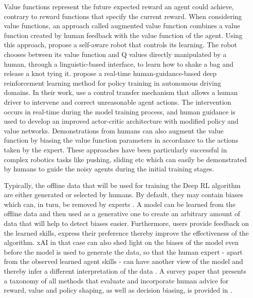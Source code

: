 \documentclass[twoside,11pt]{article}
\begin{document}
Value functions represent the future expected reward an agent could achieve, contrary to reward functions that specify the current reward. When considering value functions, an approach called augmented value function combines a value function created by human feedback with the value function of the agent. Using this approach, \cite{kartoun:10} propose a self-aware robot that controls its learning. The robot chooses between its value function and Q values directly manipulated by a human, through a linguistic-based interface, to learn how to shake a bag and release a knot tying it. \cite{jiang:21} propose a real-time human-guidance-based deep reinforcement learning method for policy training in autonomous driving domains. In their work, \cite{wu:21} use a control transfer mechanism that allows a human driver to intervene and correct unreasonable agent actions. The intervention occurs in real-time during the model training process, and human guidance is used to develop an improved actor-critic architecture with modified policy and value networks. Demonstrations \citep{hester2018deep,vecerik2017leveraging,nair2018overcoming} from humans can also augment the value function by biasing the value function parameters in accordance to the  actions taken by the expert. These approaches have been particularly successful in complex robotics tasks like pushing, sliding etc which can easily be demonstrated by humans to guide the noisy agents during the initial training stages.  

Typically, the offline data that will be used for training the Deep RL algorithm are either generated or selected by humans. By default, they may contain biases which can, in turn, be removed by experts \citep{Wang:2022:SkillPreferences}. A model can be learned from the offline data and then used as a generative one to create an arbitrary amount of data that will help to detect biases easier. Furthermore, users provide feedback on the learned skills, express their preference thereby improve the effectiveness of the algorithm. xAI in that case can also shed light on the biases of the model even before the model is used to generate the data, so that the human expert - apart from the observed learned agent skills - can have another view of the model and thereby infer a different interpretation of the data \citep{Ribeiro:2016:WhyShouldITrustYou,Mehrabi:2021:SurveyBiasFairness}. A survey paper that presents a taxonomy of all methods that evaluate and incorporate human advice for reward, value and policy shaping, as well as decision biasing, is provided in \cite{Najar:2021:RLWithHumanAdvice}.
\end{document}
